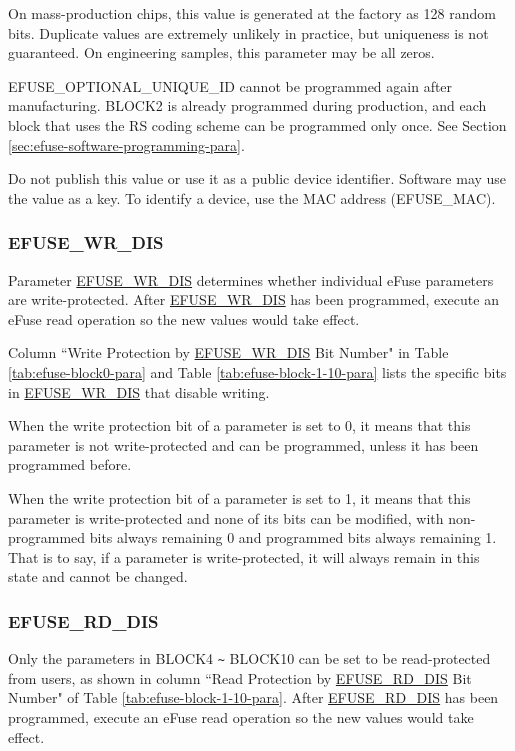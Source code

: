 \documentclass[main\_\_EN.tex]{subfiles}
\begin{document}
On mass-production chips, this value is generated at the factory as 128 random bits. Duplicate values are extremely unlikely in practice, but uniqueness is not guaranteed. On engineering samples, this parameter may be all zeros.

EFUSE\_OPTIONAL\_UNIQUE\_ID cannot be programmed again after manufacturing. BLOCK2 is already programmed during production, and each block that uses the RS coding scheme can be programmed only once. See Section \ref{sec:efuse-software-programming-para}.

Do not publish this value or use it as a public device identifier. Software may use the value as a key. To identify a device, use the MAC address (EFUSE\_MAC).

\subsubsection{EFUSE\_WR\_DIS}
\label{sec:efuse-wr-dis}

Parameter \hyperref[fielddesc:EFUSEWRDIS]{EFUSE\_WR\_DIS} determines whether individual eFuse parameters are write-protected. After \hyperref[fielddesc:EFUSEWRDIS]{EFUSE\_WR\_DIS} has been programmed, execute an eFuse read operation so the new values would take effect.

Column ``Write Protection by \hyperref[fielddesc:EFUSEWRDIS]{EFUSE\_WR\_DIS} Bit Number" in Table  \ref{tab:efuse-block0-para} and Table \ref{tab:efuse-block-1-10-para} lists the specific bits in \hyperref[fielddesc:EFUSEWRDIS]{EFUSE\_WR\_DIS} that disable writing.

When the write protection bit of a parameter is set to 0, it means that this parameter is not write-protected and can be programmed, unless it has been programmed before.

When the write protection bit of a parameter is set to 1, it means that this parameter is write-protected and none of its bits can be modified, with non-programmed bits always remaining 0 and programmed bits always remaining 1. That is to say, if a parameter is write-protected, it will always remain in this state and cannot be changed.

\subsubsection{EFUSE\_RD\_DIS}
\label{sec:efuse-rd-dis}

Only the parameters in BLOCK4 \verb+~+ BLOCK10 can be set to be read-protected from users, as shown in column ``Read Protection by \hyperref[fielddesc:EFUSERDDIS]{EFUSE\_RD\_DIS} Bit Number" of Table \ref{tab:efuse-block-1-10-para}. After \hyperref[fielddesc:EFUSERDDIS]{EFUSE\_RD\_DIS} has been programmed, execute an eFuse read operation so the new values would take effect.
\end{document}
